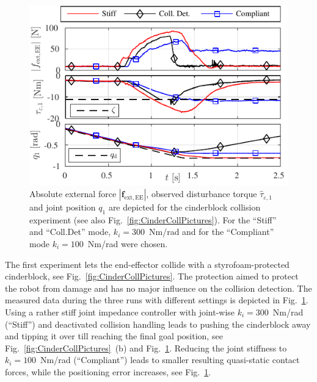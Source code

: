 %
\begin{figure}
\centering
\parbox{\columnwidth}{
\includegraphics{figures/CollDetCinderblock/Collision_Summary_Cinderblock.pdf}
}
\vspace*{-1ex}
\caption{Absolute external force $|\bm{f}_\mathrm{ext,EE}|$, observed disturbance torque $\hat{\tau}_{\varepsilon,1}$ and joint position $q_1$ are depicted for the cinderblock collision experiment (see also Fig.~\ref{fig:CinderCollPictures}).
For the ``Stiff'' and ``Coll.Det'' mode, $k_i=300$~Nm/rad and for the ``Compliant'' mode $k_i=100$~Nm/rad were chosen.}
\label{fig:CinderCollisionSummary}
\SkipBeforeText
\end{figure}
%
The first experiment lets the end-effector collide with a styrofoam-protected cinderblock, see Fig.~\ref{fig:CinderCollPictures}.
The protection aimed to protect the robot from damage and has no major influence on the collision detection.
The measured data during the three runs with different settings is depicted in Fig.~\ref{fig:CinderCollisionSummary}.
Using a rather stiff joint impedance controller with joint-wise $k_i=300$~Nm/rad  (``Stiff'') and deactivated collision handling leads to pushing the cinderblock away and tipping it over till reaching the final goal position, see Fig.~\ref{fig:CinderCollPictures}~(b) and Fig.~\ref{fig:CinderCollisionSummary}.
Reducing the joint stiffness to \mbox{$k_i=100$~Nm/rad} (``Compliant'') leads to smaller resulting quasi-static contact forces, while the positioning error increases, see Fig.~\ref{fig:CinderCollisionSummary}.

